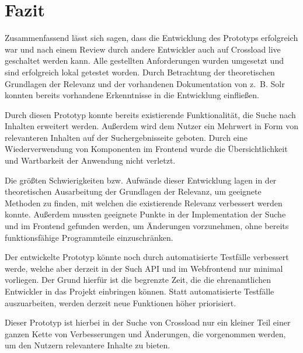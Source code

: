 \chapter{Fazit}
\label{ch:summary}

Zusammenfassend lässt sich sagen, dass die Entwicklung des Prototyps erfolgreich war und nach einem Review durch andere Entwickler auch auf Crossload live geschaltet werden kann.
Alle gestellten Anforderungen wurden umgesetzt und sind erfolgreich lokal getestet worden.
Durch Betrachtung der theoretischen Grundlagen der Relevanz und der vorhandenen Dokumentation von z. B. Solr konnten bereits vorhandene Erkenntnisse in die Entwicklung einfließen.

Durch diesen Prototyp konnte bereits existierende Funktionalität, die Suche nach Inhalten erweitert werden.
Außerdem wird dem Nutzer ein Mehrwert in Form von relevanteren Inhalten auf der Suchergebnisseite geboten.
Durch eine Wiederverwendung von Komponenten im Frontend wurde die Übersichtlichkeit und Wartbarkeit der Anwendung nicht verletzt.

Die größten Schwierigkeiten bzw. Aufwände dieser Entwicklung lagen in der theoretischen Ausarbeitung der Grundlagen der Relevanz, um geeignete Methoden zu finden, mit welchen die existierende Relevanz verbessert werden konnte.
Außerdem mussten geeignete Punkte in der Implementation der Suche und im Frontend gefunden werden, um Änderungen vorzunehmen, ohne bereits funktionsfähige Programmteile einzuschränken.

Der entwickelte Prototyp könnte noch durch automatisierte Testfälle verbessert werde, welche aber derzeit in der Such API und im Webfrontend nur minimal vorliegen.
Der Grund hierfür ist die begrenzte Zeit, die die ehrenamtlichen Entwickler in das Projekt einbringen können.
Statt automatisierte Testfälle auszuarbeiten, werden derzeit neue Funktionen höher priorisiert.

Dieser Prototyp ist hierbei in der Suche von Crossload nur ein kleiner Teil einer ganzen Kette von Verbesserungen und Änderungen, die vorgenommen werden, um den Nutzern relevantere Inhalte zu bieten.
